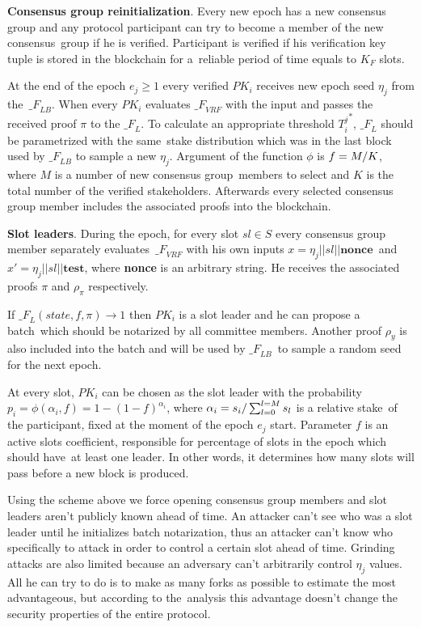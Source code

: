 \textbf{Consensus group reinitialization}.
Every new epoch has a new consensus group and any protocol participant can try to become a member of the new consensus\
group if he is verified.
Participant is verified if his verification key tuple is stored in the blockchain for a\
reliable period of time equals to $K_F$ slots.

At the end of the epoch ${e_j \geq 1}$ every verified $PK_i$ receives new epoch seed $\eta_j$ from the\
${\mathcal_{F}}_{LB}$.
When every $PK_i$ evaluates ${\mathcal_{F}}_{VRF}$ with the input
and passes the received proof $\pi$ to the ${\mathcal_{F}}_{L}$.
To calculate an appropriate threshold ${T_i^j}^*$, ${\mathcal_{F}}_{L}$ should be parametrized with the same\
stake distribution which was in the last block used by ${\mathcal_{F}}_{LB}$ to sample a new $\eta_j$.
Argument of the function $\phi$ is ${f = M /\/ K}$, where $M$ is a number of new consensus group\
members to select and $K$ is the total number of the verified stakeholders.
Afterwards every selected consensus group member includes the associated proofs into the blockchain.

\textbf{Slot leaders}.
During the epoch, for every slot ${sl \in S}$ every consensus group member separately evaluates\
${\mathcal_{F}}_{VRF}$ with his own inputs ${x = \eta_j || sl || \textbf{nonce}}$\
and ${x' = \eta_j || sl || \textbf{test}}$, where \textbf{nonce} is an arbitrary string.
He receives the associated proofs $\pi$ and $\rho_\pi$ respectively.

If ${\mathcal_{F}}_{L}(state, f, \pi) \rightarrow 1$ then $PK_i$ is a slot leader and he can propose a batch\
which should be notarized by all committee members.
Another proof $\rho_y$ is also included into the batch and will be used by  ${\mathcal_{F}}_{LB}$\
to sample a random seed for the next epoch.

At every slot, $PK_i$ can be chosen as the slot leader with the probability\
${p_i = \phi(\alpha_i, f) = 1-(1-f)^{\alpha_i}}$, where ${\alpha_i=s_i/\\\sum_{l=0}^{l=M} s_l}$ is a relative stake\
of the participant, fixed at the moment of the epoch $e_j$ start.
Parameter $f$ is an active slots coefficient, responsible for percentage of slots in the epoch which should have\
at least one leader.
In other words, it determines how many slots will pass before a new block is produced.

Using the scheme above we force opening consensus group members and slot leaders aren't publicly known ahead of time.
An attacker can't see who was a slot leader until he initializes batch notarization, thus an attacker can't know
who specifically to attack in order to control a certain slot ahead of time.
Grinding attacks are also limited because an adversary can't arbitrarily control $\eta_j$ values.
All he can try to do is to make as many forks as possible to estimate the most advantageous, but according to the\
analysis this advantage doesn't change the security properties of the entire protocol.

